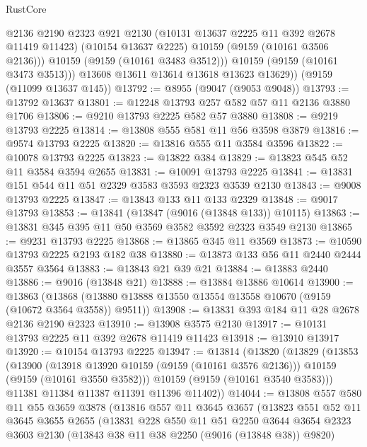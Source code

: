 \begin{lexlean}{RustCore}
\begin{coremodule}
              @2136
              @2190
              @2323
              @921
              @2130
              (@10131 @13637 @2225 @11 @392 @2678 @11419 @11423)
              (@10154 @13637 @2225)
              @10159
              (@9159 (@10161 @3506 @2136)))
            @10159
            (@9159 (@10161 @3483 @3512)))
          @10159
          (@9159 (@10161 @3473 @3513)))
        @13608
        @13611
        @13614
        @13618
        @13623
        @13629))
    (@9159 (@11099 @13637 @145))
@13792 := @8955 (@9047 (@9053 @9048))
@13793 := @13792 @13637
@13801 := @12248 @13793 @257 @582 @57 @11 @2136 @3880 @1706
@13806 := @9210 @13793 @2225 @582 @57 @3880
@13808 := @9219 @13793 @2225
@13814 := @13808 @555 @581 @11 @56 @3598 @3879
@13816 := @9574 @13793 @2225
@13820 := @13816 @555 @11 @3584 @3596
@13822 := @10078 @13793 @2225
@13823 := @13822 @384
@13829 := @13823 @545 @52 @11 @3584 @3594 @2655
@13831 := @10091 @13793 @2225
@13841 := @13831 @151 @544 @11 @51 @2329 @3583 @3593 @2323 @3539 @2130
@13843 := @9008 @13793 @2225
@13847 := @13843 @133 @11 @133 @2329
@13848 := @9017 @13793
@13853 := @13841 (@13847 (@9016 (@13848 @133)) @10115)
@13863 := @13831 @345 @395 @11 @50 @3569 @3582 @3592 @2323 @3549 @2130
@13865 := @9231 @13793 @2225
@13868 := @13865 @345 @11 @3569
@13873 := @10590 @13793 @2225 @2193 @182 @38
@13880 := @13873 @133 @56 @11 @2440 @2444 @3557 @3564
@13883 := @13843 @21 @39 @21
@13884 := @13883 @2440
@13886 := @9016 (@13848 @21)
@13888 := @13884 @13886 @10614
@13900 := @13863
    (@13868 (@13880 @13888 @13550 @13554 @13558 @10670 (@9159 (@10672 @3564 @3558)) @9511))
@13908 := @13831 @393 @184 @11 @28 @2678 @2136 @2190 @2323
@13910 := @13908 @3575 @2130
@13917 := @10131 @13793 @2225 @11 @392 @2678 @11419 @11423
@13918 := @13910 @13917
@13920 := @10154 @13793 @2225
@13947 := @13814
    (@13820
      (@13829
        (@13853
          (@13900
            (@13918 @13920 @10159 (@9159 (@10161 @3576 @2136)))
            @10159
            (@9159 (@10161 @3550 @3582)))
          @10159
          (@9159 (@10161 @3540 @3583)))
        @11381
        @11384
        @11387
        @11391
        @11396
        @11402))
@14044 := @13808
    @557
    @580
    @11
    @55
    @3659
    @3878
    (@13816
      @557
      @11
      @3645
      @3657
      (@13823
        @551
        @52
        @11
        @3645
        @3655
        @2655
        (@13831
          @228
          @550
          @11
          @51
          @2250
          @3644
          @3654
          @2323
          @3603
          @2130
          (@13843 @38 @11 @38 @2250 (@9016 (@13848 @38)) @9820)

\end{coremodule}
\end{lexlean}
